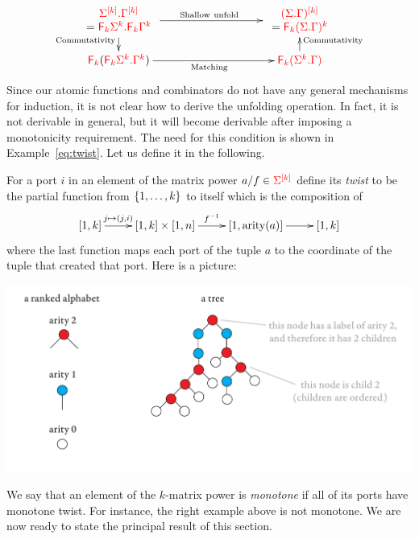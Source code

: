     \begin{align*}
        \xymatrix@R-1pc@C=3.2cm{
          {\begin{array}{c}
          \shallowterm{\mati k \rSigma} {\mati k \rGamma} \\{=\shallowterm{\reduce k {\Sigma^k}}{\reduce k {\Gamma^k}}}
          \end{array}}  \ar[d]_{{\mathrm{Commutativity}}}\ar[r]^{\mathrm{Shallow\  unfold}} &  {\begin{array}{c}
         \ranked{\mati k {(\shallowterm \Sigma \Gamma)}} \\=  \ranked{ \reduce k(\shallowterm{\Sigma}{ {\Gamma}})^k}
          \end{array}} \\
             \reduce k(\shallowterm{\reduce k {\Sigma^k}}{ {\Gamma^k}})  \ar[r]_{{\mathrm{Matching}}} &  \ranked{ \reduce k(\shallowterm{\Sigma^k}{ {\Gamma}}) } \ar[u]_{\mathrm{Commutativity}} 
        } 
    \end{align*}
Since our atomic functions and combinators do not have any general mechanisms for induction, it is not clear how to derive the unfolding operation. In fact, it is not derivable in general, but it will become derivable after imposing a monotonicity requirement. The need for this condition is shown in Example~\ref{eq:twist}.  Let us define it in the following.

For a port $i$ in an element of the matrix power $a/f \in {\color{red}{\Sigma}}^{{\color{red}{[k]}}}$ define its \emph{twist} to be the partial function from $\{1,\ldots,k\}$ to itself 
which is the composition of 
\begin{align*}
\xymatrix{
    [1,k] \ar[r]^-{j \mapsto {(j,i)}} & [1,k] \times [1,n] \ar[r]^-{f^{-1}} & [1,\arity a] \ar[r] & [1,k]
}
\end{align*}
where the last function maps each port of the tuple $a$ to the coordinate of the tuple that created that port. Here is a picture:
\begin{center}
\includegraphics[scale=.3, page=87]{pics.pdf}
\end{center}
 We say that an element of the $k$-matrix power is \emph{monotone} if all of its ports have monotone twist. For instance, the right example above is not monotone.
 We are now ready to state the principal result of this section.

